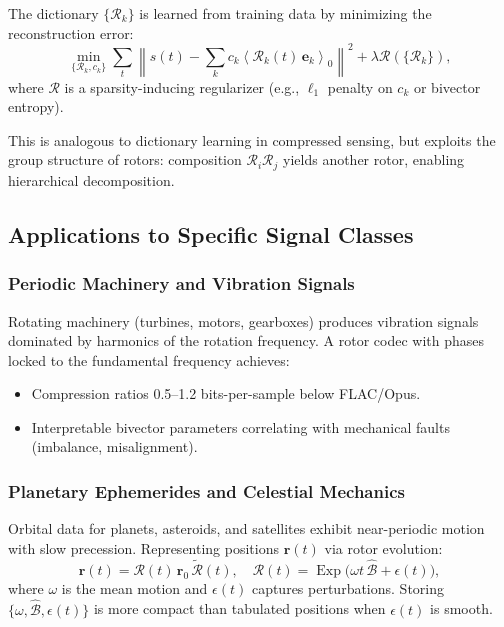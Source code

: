 \documentclass[11pt,a4paper]{article}
\newcommand{\grade}[2]{\left\langle #1 \right\rangle_{#2}}
\newcommand{\scal}[1]{\grade{#1}{0}}
\newcommand{\rev}[1]{\widetilde{#1}}           %
\newcommand{\Exp}{\operatorname{Exp}}
\newcommand{\Rotor}{\mathcal{R}}
\newcommand{\Biv}{\mathcal{B}}
\theoremstyle{definition}
\theoremstyle{plain}
\theoremstyle{remark}
\begin{document}
The dictionary $\{\Rotor_k\}$ is learned from training data by minimizing the reconstruction error:
\begin{equation}
\min_{\{\Rotor_k, c_k\}} \sum_t \left\|s(t) - \sum_k c_k \scal{\Rotor_k(t)\, \mathbf{e}_k}\right\|^2 + \lambda \mathcal{R}(\{\Rotor_k\}),
\end{equation}
where $\mathcal{R}$ is a sparsity-inducing regularizer (e.g., $\ell_1$ penalty on $c_k$ or bivector entropy).

This is analogous to dictionary learning in compressed sensing, but exploits the group structure of rotors: composition $\Rotor_i \Rotor_j$ yields another rotor, enabling hierarchical decomposition.

\subsection{Applications to Specific Signal Classes}

\subsubsection{Periodic Machinery and Vibration Signals}

Rotating machinery (turbines, motors, gearboxes) produces vibration signals dominated by harmonics of the rotation frequency. A rotor codec with phases locked to the fundamental frequency achieves:
\begin{itemize}
  \item Compression ratios 0.5--1.2 bits-per-sample below FLAC/Opus.
  \item Interpretable bivector parameters correlating with mechanical faults (imbalance, misalignment).
\end{itemize}

\subsubsection{Planetary Ephemerides and Celestial Mechanics}

Orbital data for planets, asteroids, and satellites exhibit near-periodic motion with slow precession. Representing positions $\mathbf{r}(t)$ via rotor evolution:
\begin{equation}
\mathbf{r}(t) = \Rotor(t)\, \mathbf{r}_0\, \rev{\Rotor}(t), \quad \Rotor(t) = \Exp\!\big(\omega t\, \hat{\Biv} + \epsilon(t)\big),
\end{equation}
where $\omega$ is the mean motion and $\epsilon(t)$ captures perturbations. Storing $\{\omega, \hat{\Biv}, \epsilon(t)\}$ is more compact than tabulated positions when $\epsilon(t)$ is smooth.
\end{document}
